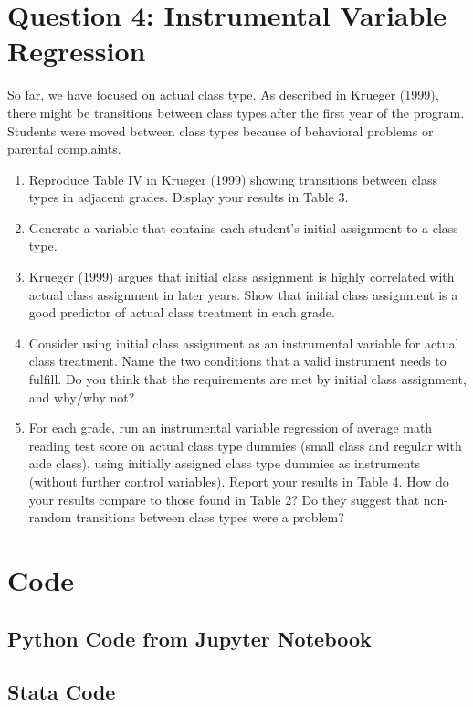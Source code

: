 \documentclass{article}
\begin{document}
\section{Question 4:  Instrumental Variable Regression}

So far, we have focused on actual class type. As described in Krueger (1999), there might be transitions between class types after the first year of the program. Students were moved between class types because of behavioral problems or parental complaints.

\begin{enumerate}[label=\alph*]

\item Reproduce Table IV in Krueger (1999) showing transitions between class types in adjacent grades. Display your results in Table 3.

\item Generate a variable that contains each student’s initial assignment to a class type.

\item Krueger (1999) argues that initial class assignment is highly correlated with actual class assignment in later years. Show that initial class assignment is a good predictor of actual class treatment in each grade.

\item Consider using initial class assignment as an instrumental variable for actual class treatment. Name the two conditions that a valid instrument needs to fulfill. Do you think that the requirements are met by initial class assignment, and why/why not?

\item For each grade, run an instrumental variable regression of average math reading test score on actual class type dummies (small class and regular with aide class), using initially assigned class type dummies as instruments (without further control variables). Report your results in Table 4. How do your results compare to those found in Table 2? Do they suggest that non-random transitions between class types were a problem?

\end{enumerate}

\section{Code}

\subsection{Python Code from Jupyter Notebook}

%

\subsection{Stata Code}

%
\end{document}
